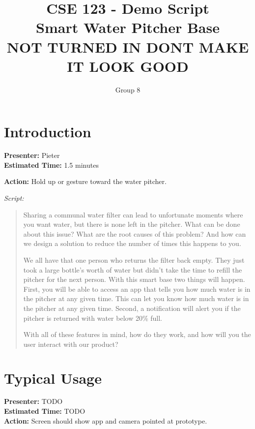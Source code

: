 \documentclass[12pt]{article}
\title{CSE 123 - Demo Script\\Smart Water Pitcher Base\\NOT TURNED IN DONT MAKE IT LOOK GOOD}
\author{Group 8}
\date{}
\begin{document}
\pagestyle{fancy}
\maketitle
\fancyfoot{}
\fancyhead{}

\section*{Introduction}
\noindent\textbf{Presenter:} Pieter\\  
\noindent\textbf{Estimated Time:} 1.5 minutes

\noindent\textbf{Action:} Hold up or gesture toward the water pitcher.

\bigskip
\noindent\textit{Script:}

\begin{quote}

Sharing a communal water filter can lead to unfortunate moments where you want water, but there is none left in the pitcher. What can be done about this issue? What are the root causes of this problem? And how can we design a solution to reduce the number of times this happens to you. 

We all have that one person who returns the filter back empty. They just took a large bottle's worth of water but didn't take the time to refill the pitcher for the next person. With this smart base two things will happen. First, you will be able to access an app that tells you how much water is in the pitcher at any given time. This can let you know how much water is in the pitcher at any given time. Second, a notification will alert you if the pitcher is returned with water below 20\% full. 

With all of these features in mind, how do they work, and how will you the user interact with our product? 

\end{quote}

\section{Typical Usage}
\noindent\textbf{Presenter:} TODO\\  
\noindent\textbf{Estimated Time:} TODO\\

\noindent\textbf{Action:} Screen should show app and camera pointed at prototype.
\end{document}
